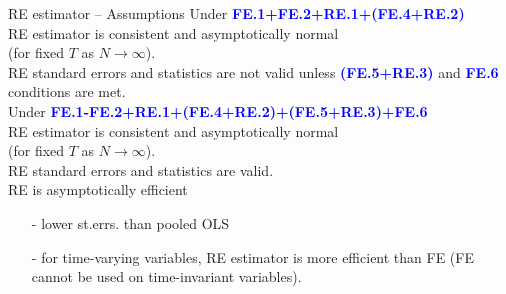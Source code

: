 \documentclass[usenames,dvipsnames]{beamer}
\begin{document}
\begin{frame}{RE estimator – Assumptions}
Under  \textcolor{Blue}{\textbf{FE.1+FE.2+RE.1+(FE.4+RE.2)}}\\
RE estimator is consistent and asymptotically normal \\(for fixed $T$ as $N \rightarrow \infty$).\\
RE standard errors and statistics are not valid unless \textcolor{Blue}{\textbf{(FE.5+RE.3)}} and  \textcolor{Blue}{\textbf{FE.6}} conditions are met.\\
\bigskip
Under  \textcolor{Blue}{\textbf{FE.1-FE.2+RE.1+(FE.4+RE.2)+(FE.5+RE.3)+FE.6}}\\
RE estimator is consistent and asymptotically normal \\(for fixed $T$ as $N \rightarrow \infty$).\\
RE standard errors and statistics are valid.\\
RE is asymptotically efficient 
\begin{itemize}
\item[-] lower st.errs. than pooled OLS
\item[-] for time-varying variables, RE estimator is more efficient than FE (FE cannot be used on time-invariant variables).
\end{itemize}
\end{frame}
\end{document}
